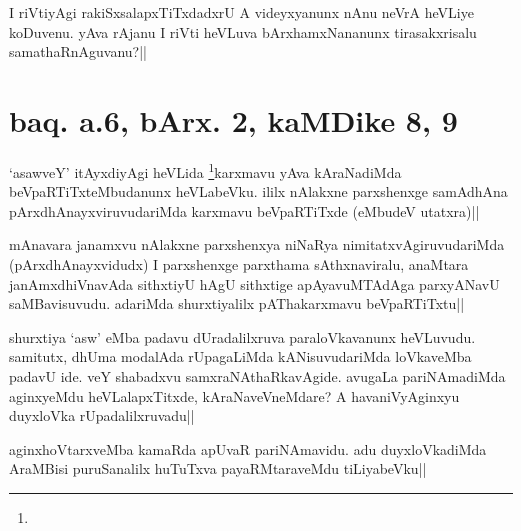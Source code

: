 \begin{artha}
I riVtiyAgi rakiSxsalapxTiTxdadxrU A videyxyanunx nAnu neVrA heVLiye 
koDuvenu. yAva rAjanu I riVti heVLuva bArxhamxNananunx tirasakxrisalu 
samathaRnAguvanu?||
\end{artha}

\section*{baq. a.6, bArx. 2, kaMDike 8, 9}

\stext

\stext


\begin{artha}
`asawveY' itAyxdiyAgi heVLida \footnote[1]{}karxmavu yAva kAraNadiMda 
beVpaRTiTxteMbudanunx heVLabeVku. ililx nAlakxne parxshenxge samAdhAna 
pArxdhAnayxviruvudariMda karxmavu beVpaRTiTxde (eMbudeV utatxra)||
\end{artha}


\begin{artha}
mAnavara janamxvu nAlakxne parxshenxya niNaRya nimitatxvAgiruvudariMda 
(pArxdhAnayxvidudx) I parxshenxge parxthama sAthxnaviralu, anaMtara 
janAmxdhiVnavAda sithxtiyU hAgU sithxtige apAyavuMTAdAga parxyANavU 
saMBavisuvudu. adariMda shurxtiyalilx pAThakarxmavu beVpaRTiTxtu||
\end{artha}


\begin{artha}
shurxtiya `asw' eMba padavu dUradalilxruva paraloVkavanunx heVLuvudu. 
samitutx, dhUma modalAda rUpagaLiMda kANisuvudariMda loVkaveMba padavU 
ide. veY shabadxvu samxraNAthaRkavAgide. avugaLa pariNAmadiMda 
aginxyeMdu heVLalapxTitxde, kAraNaveVneMdare? A havaniVyAginxyu 
duyxloVka rUpadalilxruvadu||
\end{artha}


\begin{artha}
aginxhoVtarxveMba kamaRda apUvaR pariNAmavidu. adu duyxloVkadiMda 
AraMBisi puruSanalilx huTuTxva payaRMtaraveMdu tiLiyabeVku||
\end{artha}

